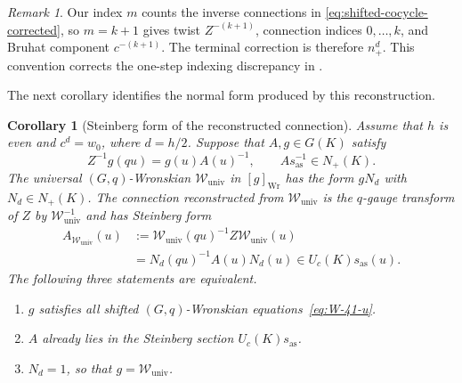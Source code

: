 \documentclass[11pt,leqno]{amsart}
\numberwithin{equation}{section}
\theoremstyle{plain}
\newtheorem{corollary}[theorem]{Corollary}
\theoremstyle{definition}
\theoremstyle{plain}
\theoremstyle{definition}
\theoremstyle{remark}
\newtheorem{remark}[theorem]{Remark}
\begin{document}
\begin{remark}\label{rem:published-indexing}
Our index $m$ counts the inverse connections in \eqref{eq:shifted-cocycle-corrected}, so $m=k+1$ gives twist $Z^{-(k+1)}$, connection indices $0,\ldots,k$, and Bruhat component $c^{-(k+1)}$.  The terminal correction is therefore $n_+^d$.  This convention corrects the one-step indexing discrepancy in \cite[Eqs.~(4.36)--(4.37), Lemma~4.19, and the terminal display in the proof of Proposition~4.20]{KZ2021}.
\end{remark}

The next corollary identifies the normal form produced by this reconstruction.
\begin{corollary}[Steinberg form of the reconstructed connection]\label{cor:universal-Wronskian-Steinberg}
Assume that $h$ is even and $c^d=w_0$, where $d=h/2$. Suppose that $A,g\in G(K)$ satisfy
\[
 Z^{-1}g(qu)=g(u)A(u)^{-1},\qquad As_{\mathrm{as}}^{-1}\in N_+(K).
\]
The universal $(G,q)$-Wronskian $\mathscr W_{\mathrm{univ}}$ in $[g]_{\mathrm{Wr}}$ has the form $gN_d$ with $N_d\in N_+(K)$. The connection reconstructed from $\mathscr W_{\mathrm{univ}}$ is the $q$-gauge transform of $Z$ by $\mathscr W_{\mathrm{univ}}^{-1}$ and has Steinberg form
\begin{equation}\label{eq:universal-Wronskian-Steinberg}
 \begin{aligned}
 A_{\mathscr W_{\mathrm{univ}}}(u)
 &:=\mathscr W_{\mathrm{univ}}(qu)^{-1}Z\mathscr W_{\mathrm{univ}}(u)\\
 &=N_d(qu)^{-1}A(u)N_d(u)
 \in U_c(K)s_{\mathrm{as}}(u).
 \end{aligned}
\end{equation}
The following three statements are equivalent.
\begin{enumerate}[label=(\roman*),topsep=3pt,itemsep=3pt]
\item $g$ satisfies all shifted $(G,q)$-Wronskian equations~\eqref{eq:W-41-u}.
\item $A$ already lies in the Steinberg section $U_c(K)s_{\mathrm{as}}$.
\item $N_d=1$, so that $g=\mathscr W_{\mathrm{univ}}$.
\end{enumerate}
\end{corollary}
\end{document}

